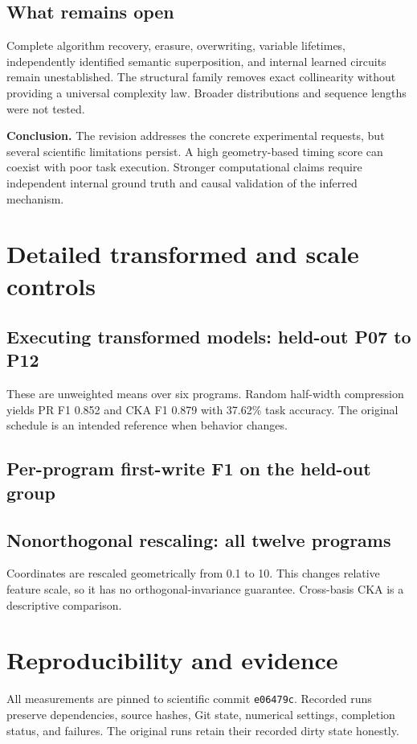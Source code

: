 \documentclass[11pt,a4paper]{article}
\newcommand{\newsection}[1]{\clearpage\section{#1}}
\begin{document}
\subsection*{What remains open}
Complete algorithm recovery, erasure, overwriting, variable lifetimes, independently identified semantic superposition, and internal learned circuits remain unestablished. The structural family removes exact collinearity without providing a universal complexity law. Broader distributions and sequence lengths were not tested.

\textbf{Conclusion.} The revision addresses the concrete experimental requests, but several scientific limitations persist. A high geometry-based timing score can coexist with poor task execution. Stronger computational claims require independent internal ground truth and causal validation of the inferred mechanism.

\newsection{Detailed transformed and scale controls}
\label{sec:detailed}
\subsection*{Executing transformed models: held-out P07 to P12}

These are unweighted means over six programs. Random half-width compression yields PR F1 0.852 and CKA F1 0.879 with 37.62\% task accuracy. The original schedule is an intended reference when behavior changes.

\subsection*{Per-program first-write F1 on the held-out group}


\subsection*{Nonorthogonal rescaling: all twelve programs}

Coordinates are rescaled geometrically from 0.1 to 10. This changes relative feature scale, so it has no orthogonal-invariance guarantee. Cross-basis CKA is a descriptive comparison.

\newsection{Reproducibility and evidence}
\label{sec:evidence}
All measurements are pinned to scientific commit \texttt{e06479c}. Recorded runs preserve dependencies, source hashes, Git state, numerical settings, completion status, and failures. The original runs retain their recorded dirty state honestly.
\end{document}
